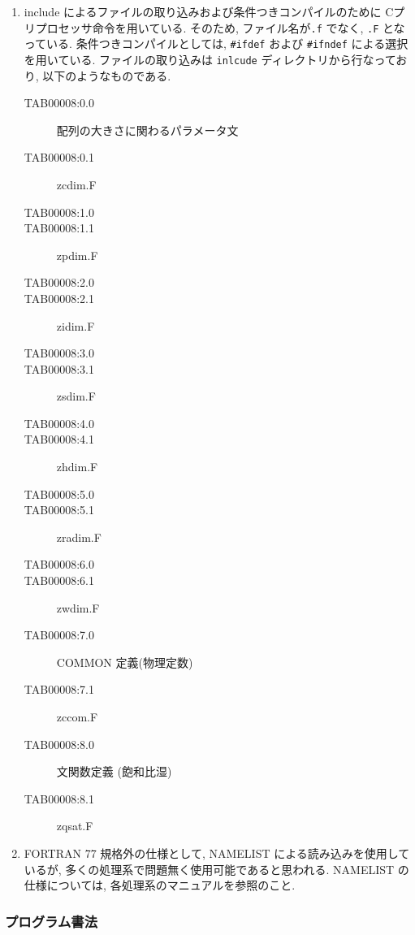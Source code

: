 \begin{enumerate}
\item include によるファイルの取り込みおよび条件つきコンパイルのために
Cプリプロセッサ命令を用いている. 
そのため, ファイル名が{\tt *.f} でなく, {\tt *.F} となっている.
条件つきコンパイルとしては, 
{\tt \#ifdef} および {\tt \#ifndef} による選択を用いている.
ファイルの取り込みは {\tt inlcude} ディレクトリから行なっており,
以下のようなものである. 
\begin{center}
  \begin{description}
\item[TAB00008:0.0] 配列の大きさに関わるパラメータ文
\item[TAB00008:0.1] zcdim.F
\item[TAB00008:1.0] 
\item[TAB00008:1.1] zpdim.F
\item[TAB00008:2.0] 
\item[TAB00008:2.1] zidim.F
\item[TAB00008:3.0] 
\item[TAB00008:3.1] zsdim.F
\item[TAB00008:4.0] 
\item[TAB00008:4.1] zhdim.F
\item[TAB00008:5.0] 
\item[TAB00008:5.1] zradim.F
\item[TAB00008:6.0] 
\item[TAB00008:6.1] zwdim.F
\item[TAB00008:7.0] COMMON 定義(物理定数)
\item[TAB00008:7.1] zccom.F
\item[TAB00008:8.0] 文関数定義 (飽和比湿)
\item[TAB00008:8.1] zqsat.F
\end{description}
\end{center}

\item FORTRAN 77 規格外の仕様として,
  NAMELIST による読み込みを使用しているが,
  多くの処理系で問題無く使用可能であると思われる.
  NAMELIST の仕様については, 各処理系のマニュアルを参照のこと.

\end{enumerate}


\subsubsection{プログラム書法}

